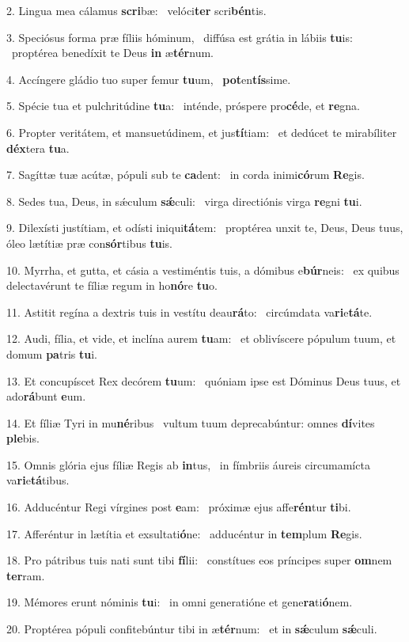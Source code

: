 2. Lingua mea cálamus \textbf{scri}bæ: \ast\  velóci\textbf{ter} scri\textbf{bén}tis.\

3. Speciósus forma præ fíliis hóminum, \dag\  diffúsa est grátia in lábiis \textbf{tu}is: \ast\  proptérea benedíxit te Deus \textbf{in} æ\textbf{tér}num.\

4. Accíngere gládio tuo super femur \textbf{tu}um, \ast\  \textbf{pot}en\textbf{tís}sime.\

5. Spécie tua et pulchritúdine \textbf{tu}a: \ast\  inténde, próspere pro\textbf{cé}de, et \textbf{re}gna.\

6. Propter veritátem, et mansuetúdinem, et jus\textbf{tí}tiam: \ast\  et dedúcet te mirabíliter \textbf{déx}tera \textbf{tu}a.\

7. Sagíttæ tuæ acútæ, pópuli sub te \textbf{ca}dent: \ast\  in corda inimi\textbf{có}rum \textbf{Re}gis.\

8. Sedes tua, Deus, in sǽculum \textbf{sǽ}culi: \ast\  virga directiónis virga \textbf{re}gni \textbf{tu}i.\

9. Dilexísti justítiam, et odísti iniqui\textbf{tá}tem: \ast\  proptérea unxit te, Deus, Deus tuus, óleo lætítiæ præ con\textbf{sór}tibus \textbf{tu}is.\

10. Myrrha, et gutta, et cásia a vestiméntis tuis, a dómibus e\textbf{búr}neis: \ast\  ex quibus delectavérunt te fíliæ regum in ho\textbf{nó}re \textbf{tu}o.\

11. Astitit regína a dextris tuis in vestítu deau\textbf{rá}to: \ast\  circúmdata va\textbf{ri}e\textbf{tá}te.\

12. Audi, fília, et vide, et inclína aurem \textbf{tu}am: \ast\  et oblivíscere pópulum tuum, et domum \textbf{pa}tris \textbf{tu}i.\

13. Et concupíscet Rex decórem \textbf{tu}um: \ast\  quóniam ipse est Dóminus Deus tuus, et ado\textbf{rá}bunt \textbf{e}um.\

14. Et fíliæ Tyri in mu\textbf{né}ribus \ast\  vultum tuum deprecabúntur: omnes \textbf{dí}vites \textbf{ple}bis.\

15. Omnis glória ejus fíliæ Regis ab \textbf{in}tus, \ast\  in fímbriis áureis circumamícta va\textbf{ri}e\textbf{tá}tibus.\

16. Adducéntur Regi vírgines post \textbf{e}am: \ast\  próximæ ejus affe\textbf{rén}tur \textbf{ti}bi.\

17. Afferéntur in lætítia et exsultati\textbf{ó}ne: \ast\  adducéntur in \textbf{tem}plum \textbf{Re}gis.\

18. Pro pátribus tuis nati sunt tibi \textbf{fí}lii: \ast\  constítues eos príncipes super \textbf{om}nem \textbf{ter}ram.\

19. Mémores erunt nóminis \textbf{tu}i: \ast\  in omni generatióne et gene\textbf{ra}ti\textbf{ó}nem.\

20. Proptérea pópuli confitebúntur tibi in æ\textbf{tér}num: \ast\  et in \textbf{sǽ}culum \textbf{sǽ}culi.\

